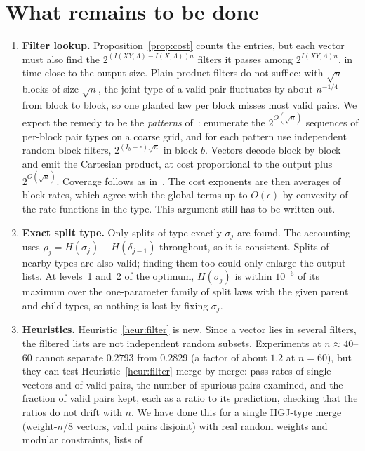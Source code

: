 \documentclass[11pt]{article}
\theoremstyle{definition}
\theoremstyle{remark}
\newcommand{\status}[1]{}   %
\begin{document}
\section{What remains to be done}\label{sec:open}
\begin{enumerate}
\item \textbf{Filter lookup.} Proposition~\ref{prop:cost} counts the entries, but each vector must also find the
$2^{(I(XY;\Lambda)-I(X;\Lambda))n}$ filters it passes among $2^{I(XY;\Lambda)n}$, in time close to the output size.
Plain product filters do not suffice: with $\sqrt n$ blocks of size $\sqrt n$, the joint type of a valid pair
fluctuates by about $n^{-1/4}$ from block to block, so one planted law per block misses most valid pairs. We expect
the remedy to be the \emph{patterns} of~\cite[\S4]{OAI26}: enumerate the $2^{O(\sqrt n)}$ sequences of per-block
pair types on a coarse grid, and for each pattern use independent random block filters, $2^{(I_b+\epsilon)\sqrt n}$
in block $b$. Vectors decode block by block and emit the Cartesian product, at cost proportional to the output
plus $2^{O(\sqrt n)}$. Coverage follows as in~\cite[Lemma~4.2(i)]{OAI26}. The cost exponents are then averages of
block rates, which agree with the global terms up to $O(\epsilon)$ by convexity of the rate functions in the type.
This argument still has to be written out.
\status{open}
\item \textbf{Exact split type.} Only splits of type exactly $\sigma_j$ are found. The accounting uses
$\rho_j=H(\sigma_j)-H(\delta_{j-1})$ throughout, so it is consistent. Splits of nearby types are also valid; finding
them too could only enlarge the output lists. At levels~1 and~2 of the optimum, $H(\sigma_j)$ is within $10^{-6}$ of
its maximum over the one-parameter family of split laws with the given parent and child types, so nothing is lost
by fixing $\sigma_j$.
\status{numerical check; otherwise open}
\item \textbf{Heuristics.} Heuristic~\ref{heur:filter} is new. Since a vector lies in several filters, the filtered
lists are not independent random subsets. Experiments at $n\approx40$--$60$ cannot separate $0.2793$ from
$0.2829$ (a factor of about $1.2$ at $n=60$), but they can test Heuristic~\ref{heur:filter} merge by merge: pass rates
of single vectors and of valid pairs, the number of spurious pairs examined, and the fraction of valid pairs kept,
each as a ratio to its prediction, checking that the ratios do not drift with $n$. We have done this for a single
HGJ-type merge (weight-$n/8$ vectors, valid pairs disjoint) with real random weights and modular constraints, lists of

\end{enumerate}
\end{document}
